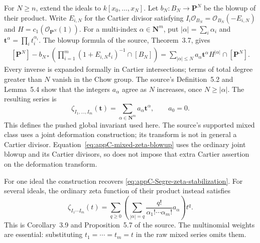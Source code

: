 For $N\geq n$, extend the ideals to $k[x_0,\ldots,x_N]$.
Let $b_N:B_N\to\mathbf P^N$ be the blowup of their product.
Write $E_{i,N}$ for the Cartier divisor satisfying
$I_i\mathcal O_{B_N}=\mathcal O_{B_N}(-E_{i,N})$ and
$H=c_1(\mathcal O_{\mathbf P^N}(1))$. For a multi-index
$\alpha\in\mathbf N^m$, put $|\alpha|=\sum_i\alpha_i$ and
$\mathbf t^\alpha=\prod_i t_i^{\alpha_i}$.
The blowup formula of the source, Theorem~3.7, gives
\[
\begin{split}
 [\mathbf P^N]-b_{N*}\left(
     \prod_{i=1}^m(1+E_{i,N}t_i)^{-1}\cap[B_N]\right)
  =\sum_{|\alpha|\leq N}
      a_\alpha\mathbf t^\alpha H^{|\alpha|}\cap[\mathbf P^N].
\end{split}
\tag{C.35}\label{eq:appC-mixed-zeta-blowup}
\]
Every inverse is expanded formally in Cartier intersections;
terms of total degree greater than $N$ vanish in the Chow group.
The source's Definition~5.2 and Lemma~5.4 show that the integers
$a_\alpha$ agree as $N$ increases, once $N\geq|\alpha|$.
The resulting series is
\[
 \zeta_{I_1,\ldots,I_m}(\mathbf t)
   =\sum_{\alpha\in\mathbf N^m}a_\alpha\mathbf t^\alpha,
 \qquad a_0=0.
\tag{C.36}\label{eq:appC-mixed-zeta-series}
\]
This defines the pushed global invariant used here. The source's
supported mixed class uses a joint deformation construction;
its transform is not in general a Cartier divisor.
Equation~\eqref{eq:appC-mixed-zeta-blowup} uses the ordinary
joint blowup and its Cartier divisors, so does not impose that
extra Cartier assertion on the deformation transform.

For one ideal the construction recovers
\eqref{eq:appC-Segre-zeta-stabilization}. For several ideals,
the ordinary zeta function of their product instead satisfies
\[
 \zeta_{I_1\cdots I_m}(t)
  =\sum_{q\geq0}\left(
       \sum_{|\alpha|=q}\frac{q!}{\alpha_1!\cdots\alpha_m!}
                    a_\alpha\right)t^q.
\tag{C.37}\label{eq:appC-mixed-zeta-multinomial}
\]
This is Corollary~3.9 and Proposition~5.7 of the source.
The multinomial weights are essential: substituting
$t_1=\cdots=t_m=t$ in the raw mixed series omits them.

